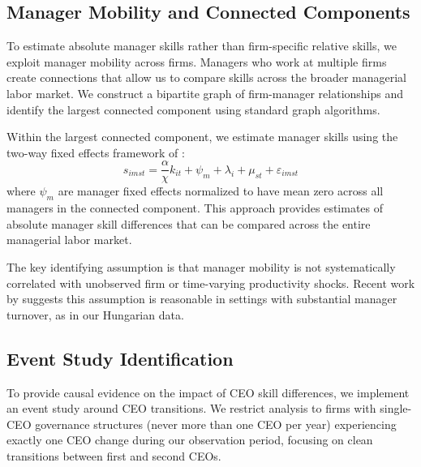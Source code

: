 \documentclass[11pt,a4paper]{article}
\begin{document}


\subsection{Manager Mobility and Connected Components}

To estimate absolute manager skills rather than firm-specific relative skills, we exploit manager mobility across firms. Managers who work at multiple firms create connections that allow us to compare skills across the broader managerial labor market. We construct a bipartite graph of firm-manager relationships and identify the largest connected component using standard graph algorithms.

Within the largest connected component, we estimate manager skills using the two-way fixed effects framework of \citet{abowd1999high}:
\begin{equation}
s_{imst} = \frac{\alpha}{\chi} k_{it} + \psi_m + \lambda_i + \mu_{st} + \varepsilon_{imst}
\end{equation}
where $\psi_m$ are manager fixed effects normalized to have mean zero across all managers in the connected component. This approach provides estimates of absolute manager skill differences that can be compared across the entire managerial labor market.

The key identifying assumption is that manager mobility is not systematically correlated with unobserved firm or time-varying productivity shocks. Recent work by \citet{metcalfe2023managers} suggests this assumption is reasonable in settings with substantial manager turnover, as in our Hungarian data.

\subsection{Event Study Identification}

To provide causal evidence on the impact of CEO skill differences, we implement an event study around CEO transitions. We restrict analysis to firms with single-CEO governance structures (never more than one CEO per year) experiencing exactly one CEO change during our observation period, focusing on clean transitions between first and second CEOs.
\end{document}
